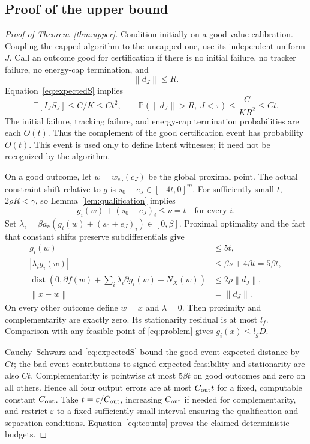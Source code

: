 \documentclass[11pt,a4paper]{article}
\newcommand{\E}{\mathbb E}
\newcommand{\Pp}{\mathbb P}
\newcommand{\eps}{\varepsilon}
\newcommand{\norm}[1]{\left\lVert#1\right\rVert}
\DeclareMathOperator{\dist}{dist}
\theoremstyle{remark}
\numberwithin{equation}{section}
\begin{document}
\subsection{Proof of the upper bound}
\begin{proof}[Proof of Theorem~\ref{thm:upper}]
Condition initially on a good value calibration. Coupling the capped algorithm to the uncapped one, use its independent uniform $J$. Call an outcome good for certification if there is no initial failure, no tracker failure, no energy-cap termination, and
\[
 \norm{d_J}\le R.
\]
Equation~\eqref{eq:expectedS} implies
\[
 \E[I_J S_J]\le C/K\le Ct^2,
 \qquad
 \Pp(\norm{d_J}>R,\ J<\tau)\le\frac{C}{KR^2}\le Ct.
\]
The initial failure, tracking failure, and energy-cap termination probabilities are each $O(t)$. Thus the complement of the good certification event has probability $O(t)$. This event is used only to define latent witnesses; it need not be recognized by the algorithm.

On a good outcome, let $w=w_{e_J}(c_J)$ be the global proximal point. The actual constraint shift relative to $g$ is $s_0+e_J\in[-4t,0]^m$. For sufficiently small $t$, $2\rho R<\gamma$, so Lemma~\ref{lem:qualification} implies
\[
 g_i(w)+(s_0+e_J)_i\le\nu=t\quad\text{for every }i.
\]
Set $\lambda_i=\beta a_\nu(g_i(w)+(s_0+e_J)_i)\in[0,\beta]$. Proximal optimality and the fact that constant shifts preserve subdifferentials give
\begin{align*}
 g_i(w)&\le5t,\\
 |\lambda_i g_i(w)|&\le\beta\nu+4\beta t=5\beta t,\\
 \dist\left(0,\partial f(w)+\sum_i\lambda_i\partial g_i(w)+N_X(w)\right)
 &\le2\rho\norm{d_J},\\
 \norm{x-w}&=\norm{d_J}.
\end{align*}
On every other outcome define $w=x$ and $\lambda=0$. Then proximity and complementarity are exactly zero. Its stationarity residual is at most $l_f$. Comparison with any feasible point of \eqref{eq:problem} gives $g_i(x)\le l_gD$.

Cauchy--Schwarz and \eqref{eq:expectedS} bound the good-event expected distance by $Ct$; the bad-event contributions to signed expected feasibility and stationarity are also $Ct$. Complementarity is pointwise at most $5\beta t$ on good outcomes and zero on all others. Hence all four output errors are at most $C_{\rm out}t$ for a fixed, computable constant $C_{\rm out}$. Take $t=\eps/C_{\rm out}$, increasing $C_{\rm out}$ if needed for complementarity, and restrict $\eps$ to a fixed sufficiently small interval ensuring the qualification and separation conditions. Equation~\eqref{eq:tcounts} proves the claimed deterministic budgets.
\end{proof}
\end{document}
